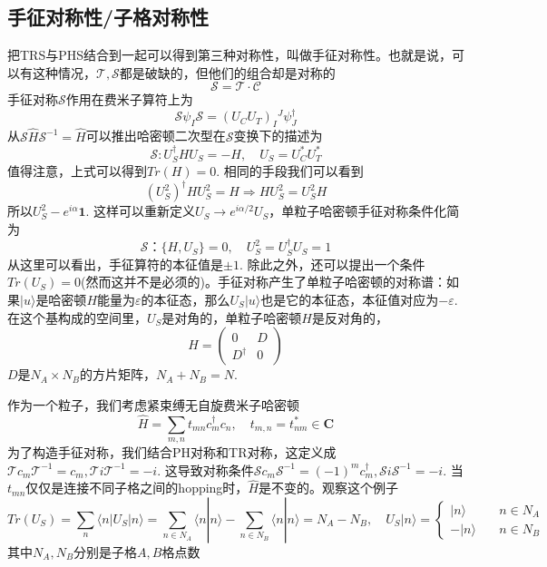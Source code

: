 \documentclass[a4paper]{article}
\numberwithin{equation}{subsection}
\newcommand{\mT}{\mathcal{T}}
\newcommand{\mC}{\mathcal{C}}
\newcommand{\mS}{\mathcal{S}}
\begin{document}
\subsection{手征对称性/子格对称性}
把TRS与PHS结合到一起可以得到第三种对称性，叫做手征对称性。也就是说，可以有这种情况，$\mT,\mS$都是破缺的，但他们的组合却是对称的
\begin{equation}
    \mS=\mT\cdot\mC
\end{equation}
手征对称$\mS$作用在费米子算符上为
\begin{equation}
    \mS \psi_I\mS=(U_CU_T)_{I}{}^J\psi_J^\dagger
\end{equation}
从$\mS\hat{H}\mS^{-1}=\hat{H}$可以推出哈密顿二次型在$\mS$变换下的描述为
\begin{equation}
    \mS:U_S^\dagger HU_S=-H,\quad U_S=U_C^*U_T^*
\end{equation}
值得注意，上式可以得到$Tr(H)=0$. 相同的手段我们可以看到
\begin{equation}
    (U_S^2)^\dagger HU_S^2=H\Rightarrow HU_S^2=U_S^2 H
\end{equation}
所以$U_S^2-e^{i\alpha}\mathbf{1}$. 这样可以重新定义$U_S\rightarrow e^{i\alpha/2}U_S$，单粒子哈密顿手征对称条件化简为
\begin{equation}
    \mS：\{H,U_S\}=0,\quad U_S^2=U_S^\dagger U_S=1
\end{equation}
从这里可以看出，手征算符的本征值是$\pm 1$. 除此之外，还可以提出一个条件$Tr(U_S)=0$(然而这并不是必须的)。手征对称产生了单粒子哈密顿的对称谱：如果$|u\rangle$是哈密顿$H$能量为$\varepsilon$的本征态，那么$U_S|u\rangle$也是它的本征态，本征值对应为$-\varepsilon$. 在这个基构成的空间里，$U_S$是对角的，单粒子哈密顿$H$是反对角的，
\begin{equation}
    H=\begin{pmatrix}
        0&D\\
        D^\dagger&0
    \end{pmatrix}
\end{equation}
$D$是$N_A\times N_B$的方片矩阵，$N_A+N_B=N$.

作为一个粒子，我们考虑紧束缚无自旋费米子哈密顿
\begin{equation}
    \hat{H}=\sum_{m,n}t_{mn}c_m^\dagger c_n,\quad t_{m,n}=t_{nm}^*\in\mathbf{C}
\end{equation}
为了构造手征对称，我们结合PH对称和TR对称，这定义成$\mT c_m\mT^{-1}=c_m,\mT i\mT^{-1}=-i$. 这导致对称条件$\mS c_m\mS^{-1}=(-1)^m c_m^\dagger, \mS i\mS^{-1}=-i$. 当$t_{mn}$仅仅是连接不同子格之间的hopping时，$\hat{H}$是不变的。观察这个例子
\begin{equation}
    Tr(U_S)=\sum_{n}\langle n|U_S|n\rangle=\sum_{n\in N_A}\langle n|n\rangle-\sum_{n\in N_B}\langle n|n\rangle=N_A-N_B,\quad U_S|n\rangle=\begin{cases}
        |n\rangle\quad &n\in N_A\\
        -|n\rangle\quad &n\in N_B
    \end{cases}
\end{equation}
其中$N_A,N_B$分别是子格$A,B$格点数
\end{document}
